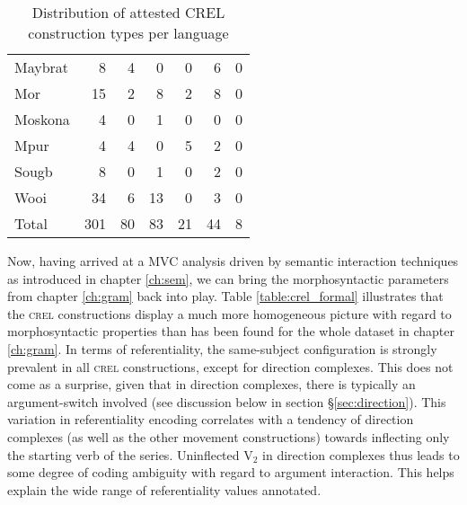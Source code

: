\begin{table}
\begin{tabular}{lrrrrrr}
  Maybrat &   8 &   4 &   0 &   0 &   6 &   0 \\ 
  Mor &  15 &   2 &   8 &   2 &   8 &   0 \\ 
  Moskona &   4 &   0 &   1 &   0 &   0 &   0 \\ 
  Mpur &   4 &   4 &   0 &   5 &   2 &   0 \\ 
  Sougb &   8 &   0 &   1 &   0 &   2 &   0 \\ 
  Wooi &  34 &   6 &  13 &   0 &   3 &   0 \\ 
   \hline
   Total & 301 & 80 & 83 & 21 & 44 & 8 \\
   \hline
\end{tabular}
\caption{Distribution of attested CREL construction types per language}
\label{table:crel_language}


\end{table}


Now, having arrived at a MVC analysis driven by semantic interaction techniques as introduced in chapter \ref{ch:sem}, we can bring the morphosyntactic parameters from chapter \ref{ch:gram} back into play. Table \ref{table:crel_formal} illustrates that the \textsc{crel} constructions display a much more homogeneous picture with regard to morphosyntactic properties than has been found for the whole dataset in chapter \ref{ch:gram}. In terms of referentiality, the same-subject configuration is strongly prevalent in all \textsc{crel} constructions, except for direction complexes. This does not come as a surprise, given that in direction complexes, there is typically an argument-switch involved (see discussion below in section §\ref{sec:direction}). This variation in referentiality encoding correlates with a tendency of direction complexes (as well as the other movement constructions) towards inflecting only the starting verb of the series. Uninflected V$_2$ in direction complexes thus leads to some degree of coding ambiguity with regard to argument interaction. This helps explain the wide range of referentiality values annotated.

